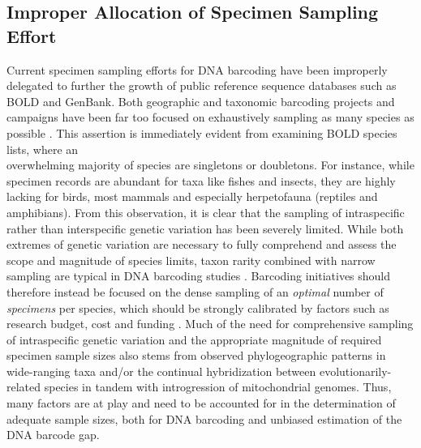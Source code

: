 \subsection{Improper Allocation of Specimen Sampling Effort}

Current specimen sampling efforts for DNA barcoding have been improperly \\ delegated to further the growth of public reference sequence databases such as BOLD and GenBank. Both geographic and taxonomic barcoding projects and campaigns have been far too focused on exhaustively sampling as many species as possible \cite{phillips2019incomplete, phillips2015exploration}. This assertion is immediately evident from examining BOLD species lists, where an \\ overwhelming majority of species are singletons or doubletons. For instance, while \\ specimen records are abundant for taxa like fishes and insects, they are highly lacking for birds, most mammals and especially herpetofauna (reptiles and amphibians). From this observation, it is clear that the sampling of intraspecific rather than interspecific genetic variation has been severely limited. While both extremes of genetic variation are necessary to fully comprehend and assess the scope and magnitude of species limits, taxon rarity combined with narrow sampling are typical in DNA barcoding studies \cite{ahrens2016rarity}. Barcoding initiatives should therefore instead be focused on the dense sampling of an \textit{optimal} number of \textit{specimens} per species, which should be strongly calibrated by factors such as research budget, cost and funding \cite{cameron2006will, stein2014is}. Much of the need for comprehensive sampling of intraspecific genetic variation and the appropriate magnitude of required specimen sample sizes also stems from observed phylogeographic patterns in wide-ranging taxa 
and/or the continual hybridization between evolutionarily-related species in tandem with introgression of mitochondrial genomes. Thus, many factors are at play and need to be accounted for in the determination of adequate sample sizes, both for DNA barcoding and unbiased estimation of the DNA barcode gap.
 
 
 
